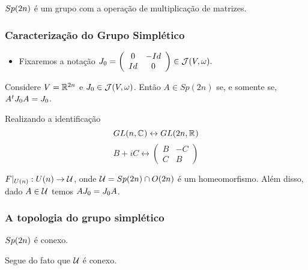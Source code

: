 \documentclass{beamer}
\begin{document}
\begin{footnotesize}
\begin{frame}
		\begin{proposicao}
			$Sp(2n)$ é um grupo com a operação de multiplicação de matrizes.
		\end{proposicao}
		
		
	\end{frame}
	
	\begin{frame}
		\frametitle{Caracterização do Grupo Simplético}
	
			\begin{itemize}
				\item Fixaremos a notação
				$
				J_{0}=
				\left(
				\begin{array}{cc}
				0 & -Id
				\\
				Id & 0
				\end{array}
				\right) \in \mathcal{J}(V, \omega) .
				$
			\end{itemize}
		
		\begin{lema}[Caracterização de $Sp(2n)$]
			 Considere $V = \mathbb{R}^{2n}$ e $J_{0} \in \mathcal{J}(V, \omega)$. Então $A\in Sp(2n)$ se, e somente se, $A^{t}J_{0} A = J_{0}$.
		\end{lema}
		
		Realizando a identificação
		$$
		GL(n, \mathbb{C}^{})\leftrightarrow GL(2n, \mathbb{R}^{})
		$$
		$$
		B+iC \leftrightarrow
		\left(
		\begin{array}{cc}
		B & -C
		\\
		C & B
		\end{array}
		\right)
		$$  
		\begin{lema}
			$F|_{U(n)}: U(n) \to \mathcal{U} $, onde $\mathcal{U}  = Sp(2n)\cap O(2n)$ é um homeomorfismo. Além disso, dado $A \in \mathcal{U} $ temos $AJ_{0}=J_{0} A$.
		\end{lema}
	\end{frame}
		
	\begin{frame}
		\frametitle{A topologia do grupo simplético}
		\begin{teorema}
			$Sp(2n)$ é conexo.
		\end{teorema}
		\begin{prova}
			Segue do fato que $\mathcal{U}$ é conexo.
		\end{prova}
		

\end{frame}
\end{footnotesize}
\end{document}
